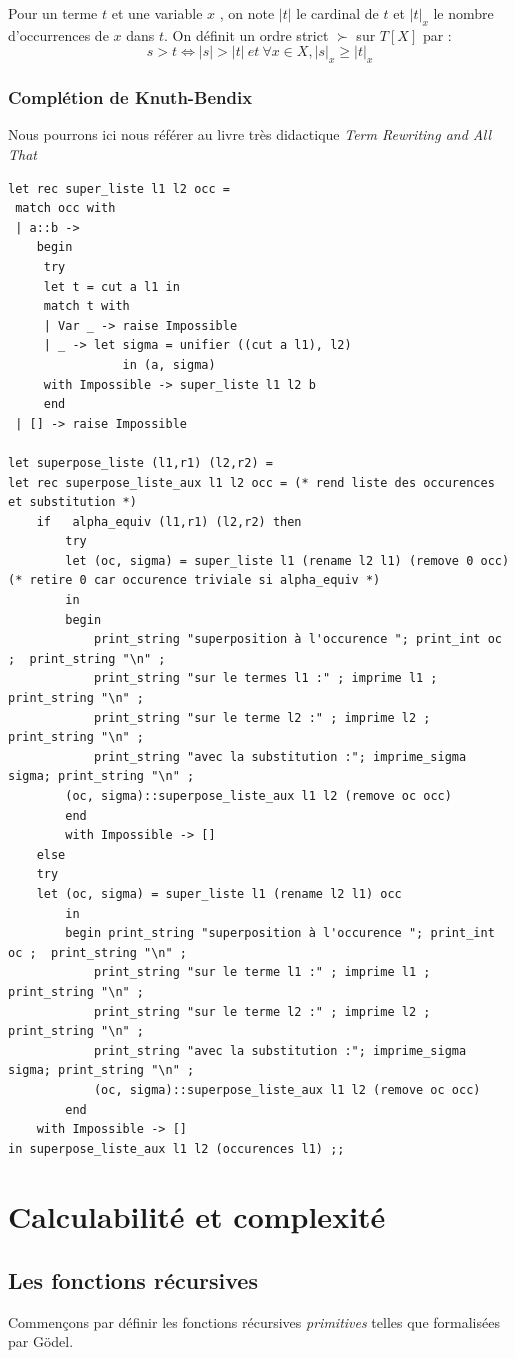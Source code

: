 \documentclass[11pt]{book}
\begin{document}
Pour un terme $t$ et une variable $x$ , on note $|t|$ le cardinal de $t$ et $|t|_x$ le nombre
d'occurrences de $x$ dans $t$. On définit un ordre strict $\succ$ sur $T[X]$ par :
$$ s > t \Leftrightarrow  |s| > |t|\ et\  \forall x \in X, |s|_x ≥ |t|_x $$

\subsection{Complétion de Knuth-Bendix}
Nous pourrons ici nous référer au livre très didactique \textit{Term Rewriting and All That}\cite{rewriting}
\begin{Verbatim}
let rec super_liste l1 l2 occ =
 match occ with
 | a::b -> 
	begin
	 try 
	 let t = cut a l1 in
	 match t with 
	 | Var _ -> raise Impossible
	 | _ -> let sigma = unifier ((cut a l1), l2)
 				in (a, sigma)
	 with Impossible -> super_liste l1 l2 b 
	 end
 | [] -> raise Impossible
  
let superpose_liste (l1,r1) (l2,r2) =
let rec superpose_liste_aux l1 l2 occ = (* rend liste des occurences et substitution *)
	if   alpha_equiv (l1,r1) (l2,r2) then 
		try
		let (oc, sigma) = super_liste l1 (rename l2 l1) (remove 0 occ) (* retire 0 car occurence triviale si alpha_equiv *)
		in 
		begin
			print_string "superposition à l'occurence "; print_int oc ;  print_string "\n" ;
			print_string "sur le termes l1 :" ; imprime l1 ; print_string "\n" ;
			print_string "sur le terme l2 :" ; imprime l2 ; print_string "\n" ;
			print_string "avec la substitution :"; imprime_sigma sigma; print_string "\n" ;
		(oc, sigma)::superpose_liste_aux l1 l2 (remove oc occ)
		end
		with Impossible -> []
	else 
	try
	let (oc, sigma) = super_liste l1 (rename l2 l1) occ
		in 
		begin print_string "superposition à l'occurence "; print_int oc ;  print_string "\n" ;
			print_string "sur le terme l1 :" ; imprime l1 ; print_string "\n" ;
			print_string "sur le terme l2 :" ; imprime l2 ; print_string "\n" ;
			print_string "avec la substitution :"; imprime_sigma sigma; print_string "\n" ;
			(oc, sigma)::superpose_liste_aux l1 l2 (remove oc occ)
		end
	with Impossible -> []
in superpose_liste_aux l1 l2 (occurences l1) ;;
\end{Verbatim}

\chapter{Calculabilité et complexité}

\section{Les fonctions récursives}
Commençons  par définir les fonctions récursives \textit{primitives} telles que formalisées par
Gödel.
\end{document}
